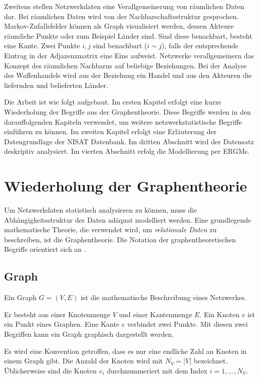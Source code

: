 \documentclass[a4paper,ngerman,oneside,titlepage,bibliography=totoc,11pt]{scrreprt}
\begin{document}
Zweitens stellen Netzwerkdaten eine Verallgemeinerung von räumlichen Daten dar. Bei räumlichen Daten wird von der Nachbarschaftsstruktur gesprochen. Markov-Zufallsfelder können als Graph visualisiert werden, dessen Akteure räumliche Punkte oder zum Beispiel Länder sind.
Sind diese benachbart, besteht eine Kante. Zwei Punkte $i, j$ sind benachbart ($i \sim j$), falls der entsprechende Eintrag in der Adjazenzmatrix eine Eins aufweist. Netzwerke verallgemeinern das Konzept des räumlichen Nachbarns auf beliebige Beziehungen. Bei der Analyse des Waffenhandels wird aus der Beziehung ein Handel und aus den Akteuren die liefernden und belieferten Länder.

Die Arbeit ist wie folgt aufgebaut. Im ersten Kapitel erfolgt eine kurze Wiederholung der Begriffe aus der Graphentheorie. Diese Begriffe werden in den darauffolgenden Kapiteln verwendet, um weitere netzwerkstatistische Begriffe einführen zu können. Im zweiten Kapitel erfolgt eine Erläuterung der Datengrundlage der NISAT Datenbank. Im dritten Abschnitt wird der Datensatz deskriptiv analysiert. Im vierten Abschnitt erfolg die Modellierung per ERGMs.





\section{Wiederholung der Graphentheorie}

Um Netzwerkdaten statistisch analysieren zu können, muss die Abhängigkeitsstruktur der Daten adäquat modelliert werden. Eine grundlegende mathematische Theorie, die verwendet wird, um \emph{relationale Daten} zu beschreiben, ist die Graphentheorie. Die Notation der graphentheoretischen Begriffe orientiert sich an \cite{kc14}.

\subsection{Graph}

Ein Graph $G = (V,E)$ ist die mathematische Beschreibung eines Netzwerkes. 

Er besteht aus einer Knotenmenge $V$ und einer Kantenmenge $E$. Ein Knoten $v$ ist ein Punkt eines Graphen. Eine Kante $e$ verbindet zwei Punkte. Mit diesen zwei Begriffen kann ein Graph graphisch dargestellt werden.

Es wird eine Konvention getroffen, dass es nur eine endliche Zahl an Knoten in einem Graph gibt. Die Anzahl der Knoten wird mit $N_V = |V|$ bezeichnet. Üblicherweise sind die Knoten $v_i$ durchnummeriert mit dem Index $i = 1, ..., N_V$. 
\end{document}
